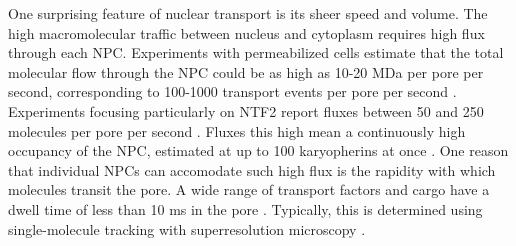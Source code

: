 One surprising feature of nuclear transport is its sheer speed and volume.  The high macromolecular traffic between nucleus and cytoplasm requires high flux through each NPC.  Experiments with permeabilized cells estimate that the total molecular flow through the NPC could be as high as 10-20 MDa per pore per second, corresponding to  100-1000 transport events per pore per second \cite{ribbeck01}.  Experiments focusing particularly on NTF2 report fluxes between 50 and 250 molecules per pore per second \cite{ribbeck01, siebrasse02, kiskin03}.  Fluxes this high mean a continuously high occupancy of the NPC, estimated at up to 100 karyopherins at once \cite{paradise07}. One reason that individual NPCs can accomodate such high flux is the rapidity with which molecules transit the pore.  A wide range of transport factors and cargo have a dwell time of less than 10 ms in the pore \cite{tu11, yang06, dange08, kubitscheck05}.  Typically, this is determined using single-molecule tracking with superresolution microscopy \cite{tu11}.




